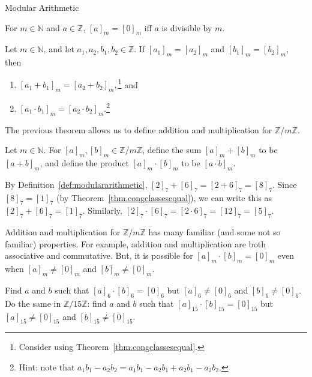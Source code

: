 \begin{section}{Modular Arithmetic}
\begin{theorem}\label{thm.divisibleiffzeromod}
For  $m\in \mathbb{N}$ and $a\in \mathbb{Z}$, $[a]_m = [0]_m$ iff $a$ is divisible by $m$.
\end{theorem}

\begin{theorem}
Let $m\in \mathbb{N}$, and let $a_1,a_2,b_1,b_2 \in \mathbb{Z}$. If $[a_1]_m = [a_2]_m$ and $[b_1]_m = [b_2]_m$, then 
\begin{enumerate}[label=\textrm{(\alph*)}]
\item $[a_1+b_1]_m = [a_2+b_2]_m,$\footnote{Consider using Theorem~\ref{thm.congclassesequal}.} and
\item $[a_1\cdot b_1]_m = [a_2\cdot b_2]_m$.\footnote{Hint: note that $a_1b_1-a_2b_2 = a_1b_1 -a_2b_1 + a_2b_1-a_2b_2$.}
\end{enumerate}
\end{theorem}

The previous theorem allows us to define addition and multiplication for $\mathbb{Z}/m\mathbb{Z}$. 

\begin{definition}\label{def:modulararithmetic}
Let $m\in \mathbb{N}$. For $[a]_m, [b]_m \in \mathbb{Z}/m\mathbb{Z}$, define the sum $[a]_m + [b]_m$ to be $[a+b]_m$, and define the product $[a]_m \cdot [b]_m$ to be $ [a\cdot b]_m$.
\end{definition}

\begin{example}
By Definition~\ref{def:modulararithmetic}, $[2]_7+[6]_7 = [2+6]_7 = [8]_7$. Since $[8]_7 = [1]_7$ (by Theorem~\ref{thm.congclassesequal}), we can write this as $[2]_7+[6]_7 = [1]_7$. Similarly, $[2]_7\cdot[6]_7 = [2\cdot6]_7 = [12]_7 = [5]_7$.
\end{example}

\begin{remark}
Addition and multiplication for $\mathbb{Z}/m\mathbb{Z}$ has many familiar (and some not so familiar) properties. For example, addition and multiplication are both associative and commutative. But, it is possible for $[a]_m\cdot[b]_m = [0]_m$ even when $[a]_m \neq [0]_m$ and $[b]_m \neq [0]_m$.
\end{remark}

\begin{exercise}
Find $a$ and $b$ such that $[a]_6\cdot[b]_6 = [0]_6$ but $[a]_6 \neq [0]_6$ and $[b]_6 \neq [0]_6$. Do the same in $\mathbb{Z}/15\mathbb{Z}$: find $a$ and $b$ such that $[a]_{15}\cdot[b]_{15} = [0]_{15}$ but $[a]_{15} \neq [0]_{15}$ and $[b]_{15} \neq [0]_{15}$.
\end{exercise}


\end{section}
